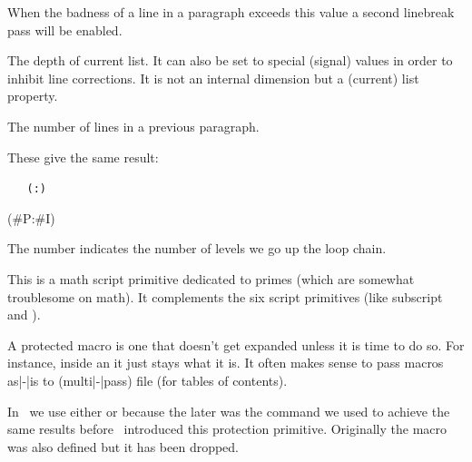 \stopnewprimitive

\startoldprimitive[title={\prm {pretolerance}}]

When the badness of a line in a paragraph exceeds this value a second linebreak
pass will be enabled.

\stopoldprimitive

\startoldprimitive[title={\prm {prevdepth}}]

The depth of current list. It can also be set to special (signal) values in order
to inhibit line corrections. It is not an internal dimension but a (current) list
property.

\stopoldprimitive

\startoldprimitive[title={\prm {prevgraf}}]

The number of lines in a previous paragraph.

\stopoldprimitive

\startnewprimitive[title={\prm {previousloopiterator}}]

\startbuffer
\edef\testA{
    \expandedrepeat 2 {%
        \expandedrepeat 3 {%
            (\the\previousloopiterator1:\the\currentloopiterator)
        }%
    }%
}
\edef\testB{
    \expandedrepeat 2 {%
        \expandedrepeat 3 {%
            (#P:#I) %
        }%
    }%
}
\stopbuffer

\typebuffer \getbuffer

These give the same result:

\startlines \tt
\meaningasis\testA
\meaningasis\testB
\stoplines

The number indicates the number of levels we go up the loop chain.

\stopnewprimitive

\startnewprimitive[title={\prm {primescript}}]

This is a math script primitive dedicated to primes (which are somewhat
troublesome on math). It complements the six script primitives (like \prm
{subscript} and ).

\stopnewprimitive

\startoldprimitive[title={\prm {protected}}]

A protected macro is one that doesn't get expanded unless it is time to do so.
For instance, inside an  it just stays what it is. It often makes
sense to pass macros as|-|is to (multi|-|pass) file (for tables of contents).

In \CONTEXT\ we use either  or  because the
later was the command we used to achieve the same results before \ETEX\
introduced this protection primitive. Originally the  macro was
also defined but it has been dropped.


